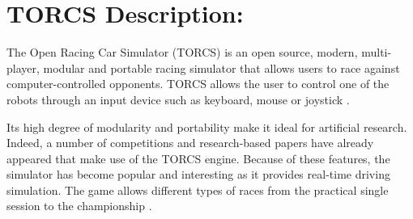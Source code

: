 \documentclass[runningheads,a4paper]{llncs}
\begin{document}
\section{ TORCS Description: }
	\label{sec:torcs}
The Open Racing Car Simulator (TORCS) is an open source, modern, multi-player, modular and portable racing simulator that allows users to race against computer-controlled opponents. TORCS allows the user to control one of the robots through an input device such as keyboard, mouse or joystick \cite{manualTORCS}.

Its high degree of modularity and portability make it ideal for artificial research. Indeed, a number of competitions and research-based papers have already appeared that make use of the TORCS  engine\cite{WebTORCS}. Because of these features, the simulator has become popular and interesting as it provides real-time driving simulation\cite{manualTORCS}.  The game allows different types of races from the practical single session to the championship \cite{manualTORCS}.
\end{document}
